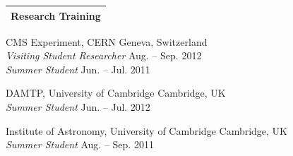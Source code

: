 \documentclass[letterpaper,11pt]{article}
\newenvironment{packed_itemize}{
\begin{itemize}[label=\raisebox{0.25ex}{\tiny$\bullet$}]
  \setlength{\itemsep}{4.2pt}
  \setlength{\parskip}{0pt}
  \setlength{\parsep}{0pt}}{\end{itemize}
}
\begin{document}

%
%
%


\noindent
\begin{tabular*}{\textwidth}{l@{\extracolsep{\fill}}}
\large {\sc \Large{Research Training}}\\
\hline
\end{tabular*}\vspace{1.mm}

\begin{packed_itemize}
  \item CMS Experiment, CERN \hfill Geneva, Switzerland \\ \emph{Visiting Student Researcher} \hfill Aug. -- Sep. 2012 \\ \emph{Summer Student} \hfill Jun. -- Jul. 2011
  \item DAMTP, University of Cambridge \hfill Cambridge, UK \\ \emph{Summer Student} \hfill Jun. -- Jul. 2012
  \item Institute of Astronomy, University of Cambridge \hfill Cambridge, UK \\ \emph{Summer Student} \hfill Aug. -- Sep. 2011
\end{packed_itemize}
\vspace{2.0mm}
\end{document}
